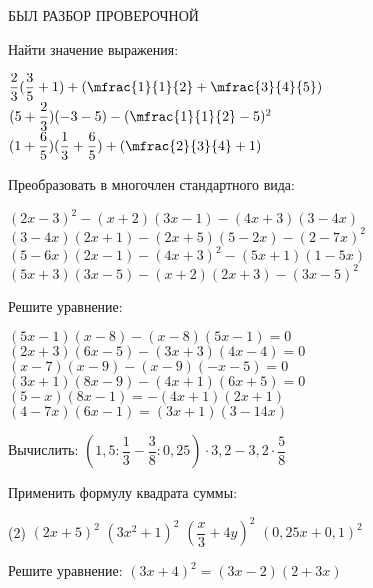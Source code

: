 %
%
\begin{class}[number=1]
	\begin{listofex}
		\item БЫЛ РАЗБОР ПРОВЕРОЧНОЙ
	\end{listofex}
\end{class}
\begin{class}[number=2]
	\begin{listofex}
		\item Найти значение выражения:
		\begin{itasks}[1]
			\task \( \dfrac{2}{3}(\dfrac{3}{5}+1)+(\mfrac{1}{1}{2}+\mfrac{3}{4}{5}) \)
			\task \( (5+\dfrac{2}{3})(-3-5)-(\mfrac{1}{1}{2}-5)^2 \)
			\task \( (1+\dfrac{6}{5})(\dfrac{1}{3}+\dfrac{6}{5})+(\mfrac{2}{3}{4}+1) \)
		\end{itasks}
		\item Преобразовать в многочлен стандартного вида:
		\begin{itasks}[1]
			\task \( (2x-3)^2-(x+2)(3x-1)-(4x+3)(3-4x) \)
			\task \( (3-4x)(2x+1)-(2x+5)(5-2x)-(2-7x)^2 \)
			\task \( (5-6x)(2x-1)-(4x+3)^2-(5x+1)(1-5x) \)
			\task \( (5x+3)(3x-5)-(x+2)(2x+3)-(3x-5)^2 \)
		\end{itasks}
		\item Решите уравнение:
		\begin{itasks}[1]
			\task \( (5x-1)(x-8)-(x-8)(5x-1)=0 \)
			\task \( (2x+3)(6x-5)-(3x+3)(4x-4)=0 \)
			\task \( (x-7)(x-9)-(x-9)(-x-5)=0 \)
			\task \( (3x+1)(8x-9)-(4x+1)(6x+5)=0 \)
			\task \( (5-x)(8x-1)=-(4x+1)(2x+1) \)
			\task \( (4-7x)(6x-1)=(3x+1)(3-14x) \)
		\end{itasks}
	\end{listofex}
\end{class}

\begin{homework}[number=1]
	\begin{listofex}
		\item Вычислить: \( \left(  1,5 : \dfrac{1}{3} - \dfrac{3}{8} : 0,25 \right) \cdot 3,2 - 3,2 \cdot \dfrac{5}{8} \)
		\item Применить формулу квадрата суммы:
		\begin{tasks}(2)
			\task \( (2x+5)^2 \)
			\task \( (3x^2+1)^2 \)
			\task \( \left( \dfrac{x}{3}+4y \right)^2 \)
			\task \( (0,25x+0,1)^2 \)
		\end{tasks}
		\item Решите уравнение: \( (3x+4)^2=(3x-2)(2+3x) \)
	\end{listofex}
\end{homework}

